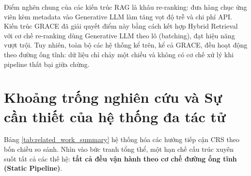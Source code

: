 Điểm nghẽn chung của các kiến trúc RAG là khâu re-ranking: đưa hàng chục ứng viên kèm metadata vào Generative LLM làm tăng vọt độ trễ và chi phí API. Kiến trúc GRACE \cite{phan2025grace} đã giải quyết điểm này bằng cách kết hợp Hybrid Retrieval với cơ chế re-ranking dùng Generative LLM theo lô (batching), đạt hiệu năng vượt trội. Tuy nhiên, toàn bộ các hệ thống kể trên, kể cả GRACE, đều hoạt động theo đường ống tĩnh: dữ liệu chỉ chảy một chiều và không có cơ chế xử lý khi pipeline thất bại giữa chừng.

\section{Khoảng trống nghiên cứu và Sự cần thiết của hệ thống đa tác tử}

Bảng \ref{tab:related_work_summary} hệ thống hóa các hướng tiếp cận CRS theo bốn chiều so sánh. Nhìn vào bức tranh tổng thể, một hạn chế cấu trúc xuyên suốt tất cả các thế hệ: \textbf{tất cả đều vận hành theo cơ chế đường ống tĩnh (Static Pipeline)}.

